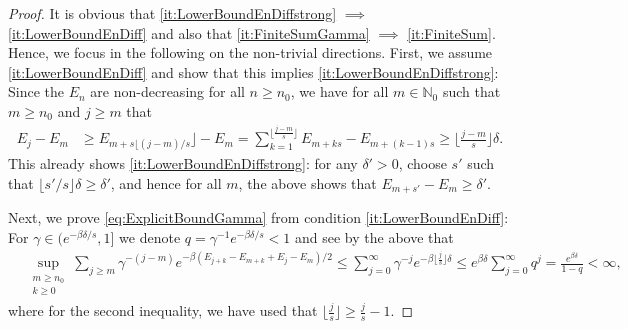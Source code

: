 \documentclass[11pt]{amsart}
\newcommand{\1}{\mathbbm{1}}
\newcommand{\N}{\mathbb{N}}
\theoremstyle{plain}
\theoremstyle{definition}
\theoremstyle{remark}
\numberwithin{equation}{section}
\begin{document}
\begin{proof}
It is obvious that  \eqref{it:LowerBoundEnDiffstrong} $\implies$ \eqref{it:LowerBoundEnDiff} and also that \eqref{it:FiniteSumGamma} $\implies$ \eqref{it:FiniteSum}. Hence, we focus in the following on the non-trivial directions. First, we assume \eqref{it:LowerBoundEnDiff} and show that this implies \eqref{it:LowerBoundEnDiffstrong}: Since the $E_n$ are non-decreasing for all $n\ge n_0$, we have for all $m\in\N_0$ such that $m\ge n_0$ and $j\ge m$ that
\begin{align*}
    E_{j}- E_m &\ge E_{m+s\lfloor(j-m)/s}\rfloor- E_m =  \sum_{k=1}^{\lfloor\frac{j-m}{s}\rfloor} E_{m+ks} - E_{m+(k-1)s} \ge \lfloor\frac{j-m}{s}\rfloor \delta.
\end{align*}
This already shows \eqref{it:LowerBoundEnDiffstrong}: for any $\delta'>0$, choose $s'$ such that $\lfloor s'/s\rfloor \delta\ge \delta'$, and hence for all $m$, the above shows that $E_{m+s'}-E_m\ge \delta'$.

Next, we prove \eqref{eq:ExplicitBoundGamma} from condition \eqref{it:LowerBoundEnDiff}:
For $\gamma \in (e^{-\beta\delta/s},1]$ we denote $q = \gamma^{-1} e^{-\beta\delta/s} <1$ and see by the above that 
\begin{align}
\label{eq:GammaSumBound}
   &\sup_{\substack{m\ge n_0\\k\ge 0}} \sum_{j\ge m} \gamma^{-(j-m)}e^{-\beta(E_{j+k} -E_{m+k} +E_j- E_m)/2}  \le \sum_{j=0}^\infty \gamma^{-j}e^{-\beta\lfloor\frac{j}{s}\rfloor\delta}  \le 
    e^{\beta\delta}\sum_{j=0}^\infty q^j = \frac{e^{\beta\delta}}{1-q} <\infty,
\end{align}
where for the second inequality, we have used that $\lfloor\frac{j}{s}\rfloor \ge \frac{j}{s} -1$.


\end{proof}
\end{document}
